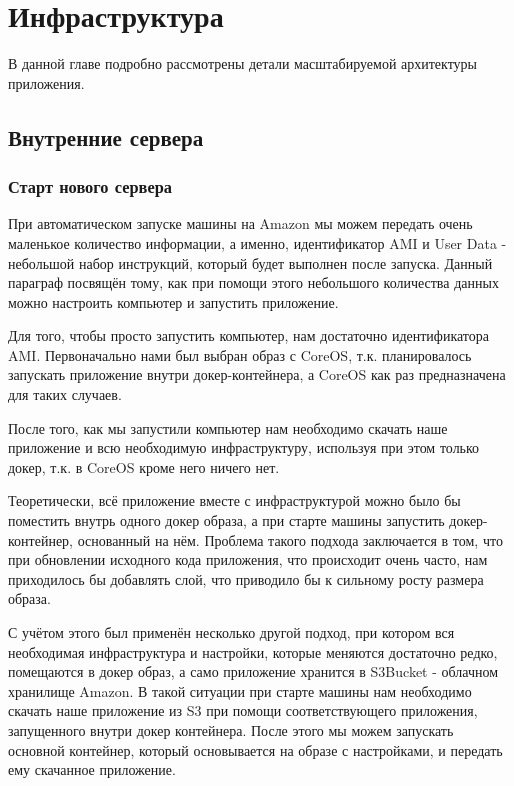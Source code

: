 
\chapter{Инфраструктура}

В данной главе подробно рассмотрены детали масштабируемой архитектуры приложения.

\section{Внутренние сервера}
\subsection{Старт нового сервера}
	При автоматическом запуске машины на Amazon мы можем передать очень маленькое количество информации, а именно, идентификатор AMI и User Data - небольшой набор инструкций, который будет выполнен после запуска. Данный параграф посвящён тому, как при помощи этого небольшого количества данных можно настроить компьютер и запустить приложение.
	
	Для того, чтобы просто запустить компьютер, нам достаточно идентификатора AMI. Первоначально нами был выбран образ с CoreOS, т.к. планировалось запускать приложение внутри докер-контейнера, а CoreOS как раз предназначена для таких случаев.
	
	После того, как мы запустили компьютер нам необходимо скачать наше приложение и всю необходимую инфраструктуру, используя при этом только докер, т.к. в CoreOS кроме него ничего нет.
	
	Теоретически, всё приложение вместе с инфраструктурой можно было бы поместить внутрь одного докер образа, а при старте машины запустить докер-контейнер, основанный на нём. Проблема такого подхода заключается в том, что при обновлении исходного кода приложения, что происходит очень часто, нам приходилось бы добавлять слой, что приводило бы к сильному росту размера образа.
	
	С учётом этого был применён несколько другой подход, при котором вся необходимая инфраструктура и настройки, которые меняются достаточно редко, помещаются в докер образ, а само приложение хранится в S3Bucket - облачном хранилище Amazon. В такой ситуации при старте машины нам необходимо  скачать наше приложение из S3 при помощи соответствующего приложения, запущенного внутри докер контейнера. После этого мы можем запускать основной контейнер, который основывается на образе с настройками, и передать ему скачанное приложение.
	
